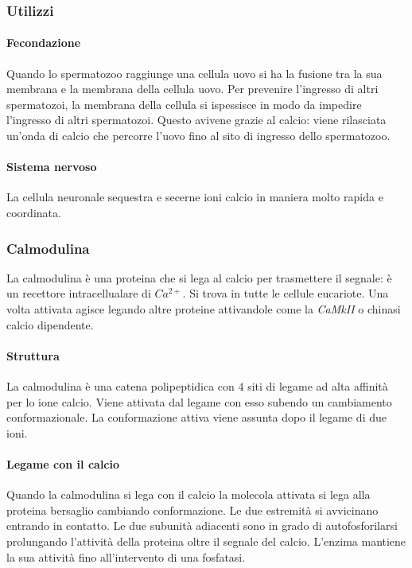 		\subsubsection{Utilizzi}

			\paragraph{Fecondazione}
			Quando lo spermatozoo raggiunge una cellula uovo si ha la fusione tra la sua membrana e la membrana della cellula uovo.
			Per prevenire l'ingresso di altri spermatozoi, la membrana della cellula si ispessisce in modo da impedire l'ingresso di altri spermatozoi.
			Questo avivene grazie al calcio: viene rilasciata un'onda di calcio che percorre l'uovo fino al sito di ingresso dello spermatozoo.

			\paragraph{Sistema nervoso}
			La cellula neuronale sequestra e secerne ioni calcio in maniera molto rapida e coordinata.

		\subsubsection{Calmodulina}
		La calmodulina \`e una proteina che si lega al calcio per trasmettere il segnale: \`e un recettore intracellualare di \emph{$Ca^{2+}$}.
		Si trova in tutte le cellule eucariote.
		Una volta attivata agisce legando altre proteine attivandole come la \emph{CaMkII} o chinasi calcio dipendente.

			\paragraph{Struttura}
			La calmodulina \`e una catena polipeptidica con $4$ siti di legame ad alta affinit\`a per lo ione calcio.
			Viene attivata dal legame con esso subendo un cambiamento conformazionale.
			La conformazione attiva viene assunta dopo il legame di due ioni.

			\paragraph{Legame con il calcio}
			Quando la calmodulina si lega con il calcio la molecola attivata si lega alla proteina bersaglio cambiando conformazione.
			Le due estremit\`a si avvicinano entrando in contatto.
			Le due subunit\`a adiacenti sono in grado di autofosforilarsi prolungando l'attivit\`a della proteina oltre il segnale del calcio.
			L'enzima mantiene la sua attivit\`a fino all'intervento di una fosfatasi.

